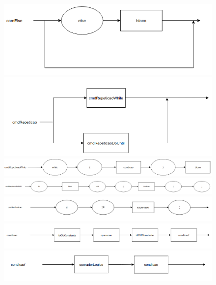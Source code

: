 \documentclass[11pt]{article}
\begin{document}
\newpage

\begin{figure}[H]
    \includegraphics[scale=2.5]{grafos_sintaticos/com_else.png}

    \includegraphics[scale=2.5]{grafos_sintaticos/cmd_repeticao.png}

    \includegraphics[scale=1.6]{grafos_sintaticos/cmd_repeticao_while.png}

    \includegraphics[scale=1.3]{grafos_sintaticos/cmd_repeticao_do_until.png}

    \includegraphics[scale=1.3]{grafos_sintaticos/cmd_atribuicao.png}

    \includegraphics[scale=2.0]{grafos_sintaticos/condicao.png}

    \includegraphics[scale=2.3]{grafos_sintaticos/condicao'.png}

    
\end{figure}
\end{document}
